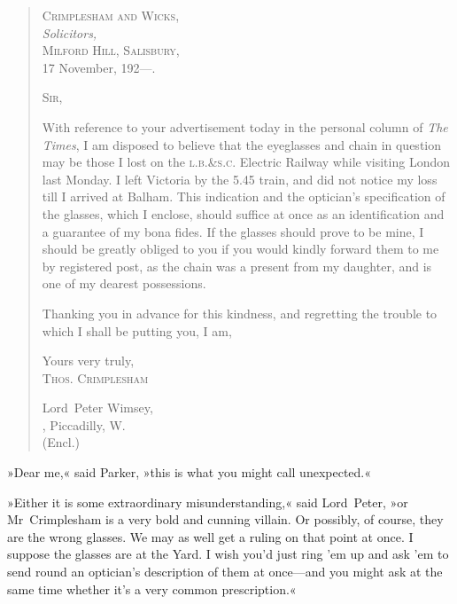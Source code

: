 \begin{quotation}
\begin{flushright}
\hfill
\begin{minipage}{0.5\linewidth}
\textsc{Crimplesham and Wicks,}\\
\vin \textit{Solicitors,}\\
\textsc{Milford Hill, Salisbury,}\\
17 November, 192---.
\end{minipage}
\end{flushright}

\noindent \textsc{Sir,}

With reference to your advertisement today in the personal column of \textit{The Times}, I am disposed to believe that the eyeglasses and chain in question may be those I lost on the \textsc{l.b.\&s.c.} Electric Railway while visiting London last Monday. I left Victoria by the 5.45 train, and did not notice my loss till I arrived at Balham. This indication and the optician's specification of the glasses, which I enclose, should suffice at once as an identification and a guarantee of my bona fides. If the glasses should prove to be mine, I should be greatly obliged to you if you would kindly forward them to me by registered post, as the chain was a present from my daughter, and is one of my dearest possessions.

Thanking you in advance for this kindness, and regretting the trouble to which I shall be putting you, I am,

\begin{flushright}
Yours very truly,\\
\textsc{Thos. Crimplesham}\\
\end{flushright}

\noindent Lord~Peter Wimsey,\\
, Piccadilly, W\@.\\
\noindent (Encl.)
\end{quotation}

»Dear me,« said Parker, »this is what you might call unexpected.«

»Either it is some extraordinary misunderstanding,« said Lord~Peter, »or Mr~Crimplesham is a very bold and cunning villain. Or possibly, of course, they are the wrong glasses. We may as well get a ruling on that point at once. I suppose the glasses are at the Yard. I wish you'd just ring 'em up and ask 'em to send round an optician's description of them at once—and you might ask at the same time whether it's a very common prescription.«

